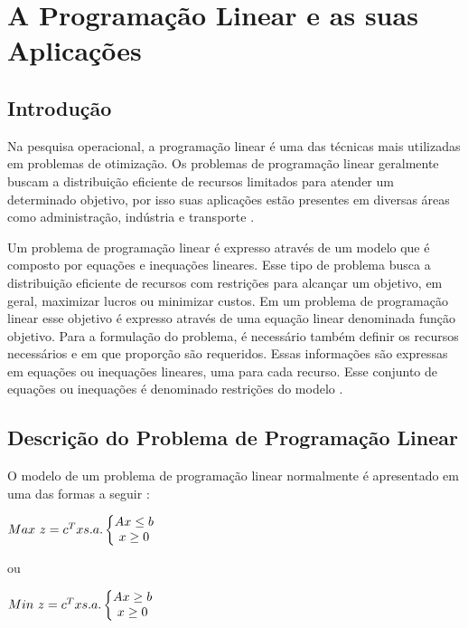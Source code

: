 \chapter{A Programação Linear e as suas Aplicações}

\section{Introdução}
Na pesquisa operacional, a programação linear é uma das técnicas mais utilizadas em problemas de otimização. Os problemas de programação linear geralmente buscam a distribuição eficiente de recursos limitados para atender um determinado objetivo, por isso suas aplicações estão presentes em diversas áreas como administração, indústria e transporte \cite{Engecom}.

Um problema de programação linear é expresso através de um modelo que é composto por equações e inequações lineares. Esse tipo de problema busca a distribuição eficiente de recursos com restrições para alcançar um objetivo, em geral, maximizar lucros ou minimizar custos. Em um problema de programação linear esse objetivo é expresso através de uma equação linear denominada função objetivo. Para a formulação do problema, é necessário também definir os recursos necessários e em que proporção são requeridos. Essas informações são expressas em equações ou inequações lineares, uma para cada recurso. Esse conjunto de equações ou inequações é denominado restrições do modelo \cite{Engecom}.

\section{Descrição do Problema de Programação Linear}
O modelo de um problema de programação linear normalmente é apresentado em uma das formas a seguir \cite{Passos}:

$\\Max\ z = c^{T}x \\\\s.a.\left\{\begin{matrix}
Ax\leq b\\x\geq 0 
\end{matrix}\right.$  

ou  

$\\Min\ z = c^{T}x \\\\s.a.\left\{\begin{matrix}
Ax\geq  b\\x\geq 0 
\end{matrix}\right.$

